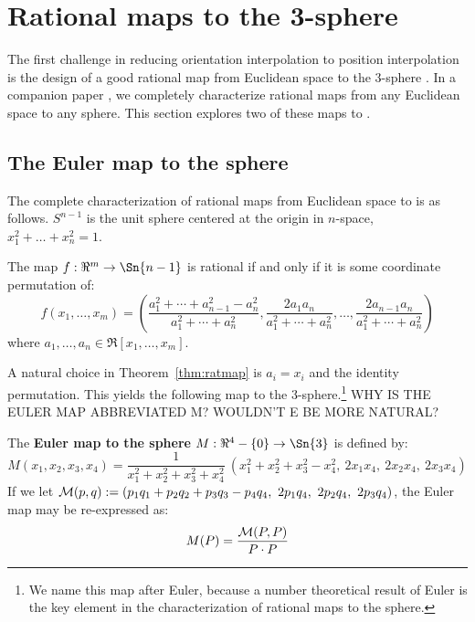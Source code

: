 \documentclass[12pt]{article}
\begin{document}
\clearpage

\section{Rational maps to the 3-sphere}
\label{sec:map}

The first challenge in reducing orientation interpolation to position interpolation
is the design of a good rational map from Euclidean space to the 3-sphere .
In a companion paper \cite{jjrm05}, we completely characterize rational maps from
any Euclidean space to any sphere.
This section explores two of these maps to .

\subsection{The Euler map to the sphere}

The complete characterization of rational maps from 
Euclidean space to  is as follows.
$S^{n-1}$ is the unit sphere centered at the origin in $n$-space,
$x_1^2 + \ldots + x_n^2 = 1$.

\begin{theorem}
\label{thm:ratmap}
The map $f: \Re^m \rightarrow \Sn{n-1}$ is rational if and only if
it is some coordinate permutation of:
\begin{equation}
\label{eq:re4s3}
f(x_1,\ldots,x_m) = 
(\frac{a_1^2 + \cdots + a_{n-1}^2 - a_n^2}{a_1^2 + \cdots + a_n^2},
	 \frac{2a_1a_n}{a_1^2 + \cdots + a_n^2},
	 \ldots, 
	 \frac{2a_{n-1}a_n}{a_1^2 + \cdots + a_n^2})
\end{equation}
where $a_1,\ldots,a_n \in \Re[x_1,\ldots,x_m]$.
\end{theorem}

A natural choice in Theorem~\ref{thm:ratmap} is $a_i = x_i$ and the identity permutation.
This yields the following map to the 3-sphere.\footnote{We name this map after Euler,
  because a number theoretical result of Euler is the key element in the
  characterization of rational maps to the sphere.}
%
WHY IS THE EULER MAP ABBREVIATED M? WOULDN'T E BE MORE NATURAL?
\begin{defn2}
The {\bf Euler map to the sphere} $M: \Re^4 - \{0\} \rightarrow \Sn{3}$ is defined by:
\begin{equation}
\label{eqM}
	M(x_1,x_2,x_3,x_4) =
	\frac{1}{x_1^2 + x_2^2 + x_3^2 + x_4^2}\ 
	(x_1^2 + x_2^2 + x_3^2 - x_4^2,\ 2x_1x_4,\ 2x_2x_4,\ 2x_3x_4)
\end{equation}
%
If we let 
${\cal M}(p,q): = (p_1q_1 + p_2q_2 + p_3q_3 - p_4q_4,\ 2p_1q_4,\ 2p_2q_4,\ 2p_3q_4)$,
the Euler map may be re-expressed as:
\begin{equation}
\label{eq:calM}
M(P) = \frac{{\cal M}(P,P)}{P \cdot P}
\end{equation}
\end{defn2}
\end{document}
